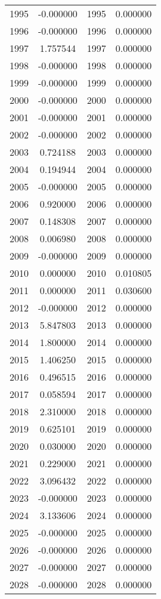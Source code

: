 \documentclass[12pt]{article}
\begin{document}
\begin{longtable}{@{}cccc@{}}
1995 & -0.000000 & 1995 & 0.000000 \\
1996 & -0.000000 & 1996 & 0.000000 \\
1997 & 1.757544 & 1997 & 0.000000 \\
1998 & -0.000000 & 1998 & 0.000000 \\
1999 & -0.000000 & 1999 & 0.000000 \\
2000 & -0.000000 & 2000 & 0.000000 \\
2001 & -0.000000 & 2001 & 0.000000 \\
2002 & -0.000000 & 2002 & 0.000000 \\
2003 & 0.724188 & 2003 & 0.000000 \\
2004 & 0.194944 & 2004 & 0.000000 \\
2005 & -0.000000 & 2005 & 0.000000 \\
2006 & 0.920000 & 2006 & 0.000000 \\
2007 & 0.148308 & 2007 & 0.000000 \\
2008 & 0.006980 & 2008 & 0.000000 \\
2009 & -0.000000 & 2009 & 0.000000 \\
2010 & 0.000000 & 2010 & 0.010805 \\
2011 & 0.000000 & 2011 & 0.030600 \\
2012 & -0.000000 & 2012 & 0.000000 \\
2013 & 5.847803 & 2013 & 0.000000 \\
2014 & 1.800000 & 2014 & 0.000000 \\
2015 & 1.406250 & 2015 & 0.000000 \\
2016 & 0.496515 & 2016 & 0.000000 \\
2017 & 0.058594 & 2017 & 0.000000 \\
2018 & 2.310000 & 2018 & 0.000000 \\
2019 & 0.625101 & 2019 & 0.000000 \\
2020 & 0.030000 & 2020 & 0.000000 \\
2021 & 0.229000 & 2021 & 0.000000 \\
2022 & 3.096432 & 2022 & 0.000000 \\
2023 & -0.000000 & 2023 & 0.000000 \\
2024 & 3.133606 & 2024 & 0.000000 \\
2025 & -0.000000 & 2025 & 0.000000 \\
2026 & -0.000000 & 2026 & 0.000000 \\
2027 & -0.000000 & 2027 & 0.000000 \\
2028 & -0.000000 & 2028 & 0.000000 \\

\end{longtable}
\end{document}
